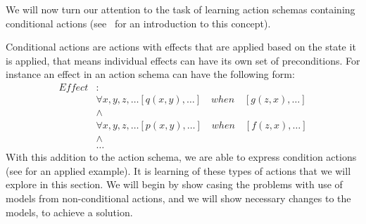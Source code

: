 \documentclass[../Master.tex]{subfiles}
\begin{document}
We will now turn our attention to the task of learning action schemas containing conditional actions (see~ for an introduction to this concept). 

Conditional actions are actions with effects that are applied based on the state it is applied, that means individual effects can have its own set of preconditions.
For instance an effect in an action schema can have the following form:
\begin{align*}
Effect&:\\
&\forall x, y, z, \dots \left[ q(x, y), \dots \right] \quad when \quad 
\left[ g(z, x), \dots  \right] \\
& \land \\
& \forall x, y, z, \dots \left[ p(x, y), \dots \right] \quad when \quad 
\left[ f(z, x), \dots  \right] \\
&\land \\ 
&\dots
\end{align*}
With this addition to the action schema, we are able to express condition actions (see  for an applied example). 
It is learning of these types of actions that we will explore in this section. 
We will begin by show casing the problems with use of models from non-conditional actions, and we will show necessary changes to the models, to achieve a solution.
\end{document}
